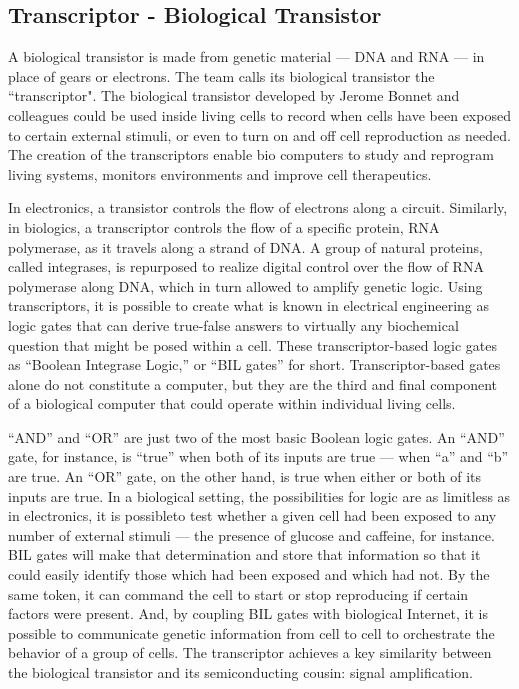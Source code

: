 \subsection{Transcriptor - Biological Transistor}

A biological transistor is made from genetic material — DNA and RNA — in place of gears or electrons. The team calls its biological transistor the “transcriptor". The biological transistor developed by Jerome Bonnet and colleagues could be used inside living cells to record when cells have been exposed to certain external stimuli, or even to turn on and off cell reproduction as needed. The creation of the transcriptors enable bio computers to study and reprogram living systems, monitors environments and improve cell therapeutics.

In electronics, a transistor controls the flow of electrons along a circuit. Similarly, in biologics, a transcriptor controls the flow of a specific protein, RNA polymerase, as it travels along a strand of DNA. A group of natural proteins, called integrases, is repurposed to realize digital control over the flow of RNA polymerase along DNA, which in turn allowed to amplify genetic logic. Using transcriptors, it is possible to create what is known in electrical engineering as logic gates that can derive true-false answers to virtually any biochemical question that might be posed within a cell. These transcriptor-based logic gates as “Boolean Integrase Logic,” or “BIL gates” for short. Transcriptor-based gates alone do not constitute a computer, but they are the third and final component of a biological computer that could operate within individual living cells.

“AND” and “OR” are just two of the most basic Boolean logic gates. An “AND” gate, for instance, is “true” when both of its inputs are true — when “a” and “b” are true. An “OR” gate, on the other hand, is true when either or both of its inputs are true. In a biological setting, the possibilities for logic are as limitless as in electronics, it is possibleto test whether a given cell had been exposed to any number of external stimuli — the presence of glucose and caffeine, for instance. BIL gates will make that determination and  store that information so that it could easily identify those which had been exposed and which had not. By the same token, it  can command the cell to start or stop reproducing if certain factors were present. And, by coupling BIL gates with biological Internet, it is possible to communicate genetic information from cell to cell to orchestrate the behavior of a group of cells. The transcriptor achieves a key similarity between the biological transistor and its semiconducting cousin: signal amplification.


